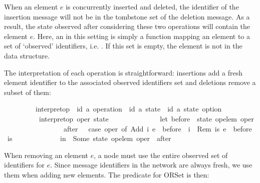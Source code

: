 When an element $e$ is concurrently inserted and deleted, the identifier of the insertion message will not be in the tombstone set of the deletion message.
As a result, the state observed after considering these two operations will contain the element $e$.
Here, an  in this setting is simply a function mapping an element to a set of `observed' identifiers, i.e. .
If this set is empty, the element is not in the data structure.

The interpretation of each operation is straightforward: insertions add a fresh element identifier to the associated observed identifiers set and deletions remove a subset of them:

\vspace{0.35em}
\begin{isabellebody}
\ \ \ \ \ \ \ \ \ interpret{\isacharunderscore}op\ {\isacharcolon}{\isacharcolon}\ {\isachardoublequoteopen}{\isacharparenleft}{\isacharprime}id{\isacharcomma}\ {\isacharprime}a{\isacharparenright}\ operation\ {\isasymRightarrow}\ {\isacharparenleft}{\isacharprime}id{\isacharcomma}\ {\isacharprime}a{\isacharparenright}\ state\ {\isasymRightarrow}\ {\isacharparenleft}{\isacharprime}id{\isacharcomma}\ {\isacharprime}a{\isacharparenright}\ state\ option{\isachardoublequoteclose}\ \isanewline
\ \ \ \ \ \ \ \ \ \ {\isachardoublequoteopen}interpret{\isacharunderscore}op\ oper\ state\ {\isasymequiv}\isanewline
\ \ \ \ \ \ \ \ \ \ \ \ \ let\ before\ {\isacharequal}\ state\ {\isacharparenleft}op{\isacharunderscore}elem\ oper{\isacharparenright}{\isacharsemicolon}\isanewline
\ \ \ \ \ \ \ \ \ \ \ \ \ \ \ \ \ after\ \ {\isacharequal}\ case\ oper\ of\ Add\ i\ e\ {\isasymRightarrow}\ before\ {\isasymunion}\ {\isacharbraceleft}i{\isacharbraceright}\ {\isacharbar}\ Rem\ is\ e\ {\isasymRightarrow}\ before\ {\isacharminus}\ is\isanewline
\ \ \ \ \ \ \ \ \ \ \ \ \ in\ \ Some\ {\isacharparenleft}state\ {\isacharparenleft}{\isacharparenleft}op{\isacharunderscore}elem\ oper{\isacharparenright}\ {\isacharcolon}{\isacharequal}\ after{\isacharparenright}{\isacharparenright}{\isachardoublequoteclose}
\end{isabellebody}
\vspace{0.35em}

When removing an element $e$, a node must use the entire observed set of identifiers for $e$.
Since message identifiers in the network are always fresh, we use them when adding new elements.
The  predicate for ORSet is then:

